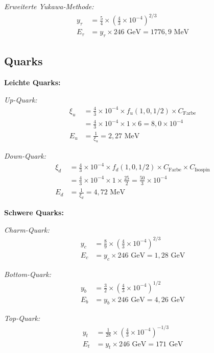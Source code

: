 \documentclass[12pt,a4paper]{article}
\begin{document}
	\textit{Erweiterte Yukawa-Methode:}
	\begin{align}
		y_\tau &= \frac{5}{4} \times \left(\frac{4}{3} \times 10^{-4}\right)^{2/3} \\
		E_\tau &= y_\tau \times 246 \text{ GeV} = 1776,9 \text{ MeV}
	\end{align}
	
	\subsection{Quarks}
	\label{subsec:quarks}
	
	\textbf{Leichte Quarks:}
	
	\textit{Up-Quark:}
	\begin{align}
		\xi_u &= \frac{4}{3} \times 10^{-4} \times f_u(1,0,1/2) \times C_{\text{Farbe}} \\
		&= \frac{4}{3} \times 10^{-4} \times 1 \times 6 = 8,0 \times 10^{-4} \\
		E_u &= \frac{1}{\xi_u} = 2,27 \text{ MeV}
	\end{align}
	
	\textit{Down-Quark:}
	\begin{align}
		\xi_d &= \frac{4}{3} \times 10^{-4} \times f_d(1,0,1/2) \times C_{\text{Farbe}} \times C_{\text{Isospin}} \\
		&= \frac{4}{3} \times 10^{-4} \times 1 \times \frac{25}{2} = \frac{50}{3} \times 10^{-4} \\
		E_d &= \frac{1}{\xi_d} = 4,72 \text{ MeV}
	\end{align}
	
	\textbf{Schwere Quarks:}
	
	\textit{Charm-Quark:}
	\begin{align}
		y_c &= \frac{8}{9} \times \left(\frac{4}{3} \times 10^{-4}\right)^{2/3} \\
		E_c &= y_c \times 246 \text{ GeV} = 1,28 \text{ GeV}
	\end{align}
	
	\textit{Bottom-Quark:}
	\begin{align}
		y_b &= \frac{3}{2} \times \left(\frac{4}{3} \times 10^{-4}\right)^{1/2} \\
		E_b &= y_b \times 246 \text{ GeV} = 4,26 \text{ GeV}
	\end{align}
	
	\textit{Top-Quark:}
	\begin{align}
		y_t &= \frac{1}{28} \times \left(\frac{4}{3} \times 10^{-4}\right)^{-1/3} \\
		E_t &= y_t \times 246 \text{ GeV} = 171 \text{ GeV}
	\end{align}
	
\end{document}
